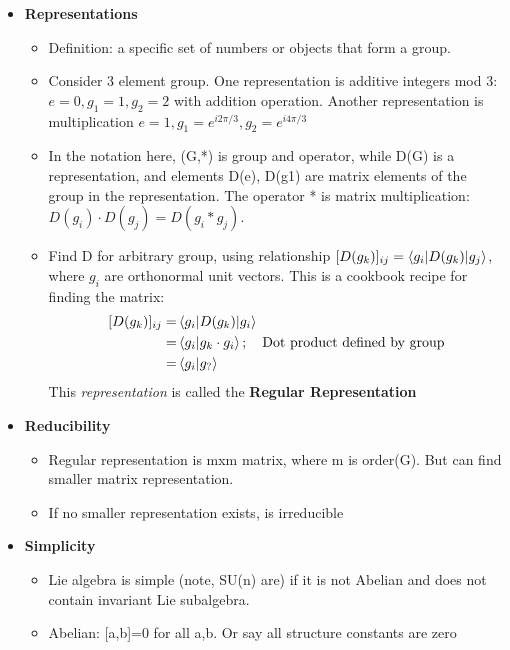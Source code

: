 \begin{itemize}
\begin{itemize}
    \item \textbf{Representations} \cite{robinson}
    \begin{itemize}
        \item Definition: a specific set of numbers or objects that form a group. \cite{robinson}
        \item Consider 3 element group. One representation is additive integers mod 3: $e=0, g_1=1, g_2=2$ with addition operation. Another representation is multiplication $e=1,g_1=e^{i2\pi/3},g_2=e^{i4\pi/3}$ \cite{robinson}
        \item In the notation here, (G,*) is group and operator, while D(G) is a representation, and elements D(e), D(g1) are matrix elements of the group in the representation. The operator * is matrix multiplication: $D(g_i)\cdot D(g_j)=D(g_i*g_j)$. \cite{robinson}
        \item Find D for arbitrary group, using relationship $[D(g_k)]_{ij}=\braket{g_i|D(g_k)|g_j}$, where $g_i$ are orthonormal unit vectors. This is a cookbook recipe for finding the matrix: \cite{robinson}
        \begin{equation}\begin{split}
            [D(g_k)]_{ij}=&\braket{g_i|D(g_k)|g_i} \\
                         =&\braket{g_i|g_k\cdot g_i};\quad\text{Dot product defined by group} \\
                         =&\braket{g_i|g_?}
        \end{split}\end{equation}
        This \emph{representation} is called the \textbf{Regular Representation}
    \end{itemize}
    \item \textbf{Reducibility} \cite{robinson}
    \begin{itemize}
        \item Regular representation is mxm matrix, where m is order(G). But can find smaller matrix representation. \cite{robinson}
        \item If no smaller representation exists, is irreducible \cite{robinson}
    \end{itemize}
    \item \textbf{Simplicity} \cite{pfeifer}
    \begin{itemize}
        \item Lie algebra is simple (note, SU(n) are) if it is not Abelian and does not contain invariant Lie subalgebra. \cite{pfeifer}
        \item Abelian: [a,b]=0 for all a,b. Or say all structure constants are zero \cite{pfeifer}

\end{itemize}
\end{itemize}
\end{itemize}
